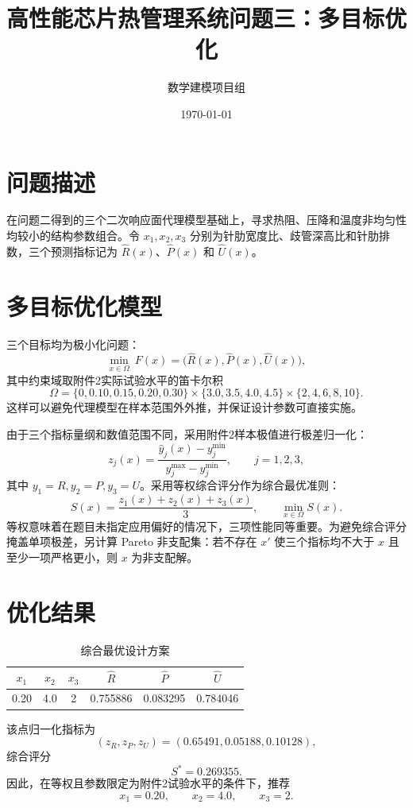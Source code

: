 \documentclass[UTF8,a4paper,12pt]{ctexart}
\title{高性能芯片热管理系统问题三：多目标优化}
\author{数学建模项目组}\date{\today}
\begin{document}
\maketitle
\section{问题描述}
在问题二得到的三个二次响应面代理模型基础上，寻求热阻、压降和温度非均匀性均较小的结构参数组合。令 $x_1,x_2,x_3$ 分别为针肋宽度比、歧管深高比和针肋排数，三个预测指标记为 $\hat R(x)$、$\hat P(x)$ 和 $\hat U(x)$。
\section{多目标优化模型}
三个目标均为极小化问题：
\begin{equation}
\min_{x\in\Omega}\ F(x)=\big(\hat R(x),\hat P(x),\hat U(x)\big),
\end{equation}
其中约束域取附件2实际试验水平的笛卡尔积
\[
\Omega=\{0,0.10,0.15,0.20,0.30\}\times\{3.0,3.5,4.0,4.5\}\times\{2,4,6,8,10\}.
\]
这样可以避免代理模型在样本范围外外推，并保证设计参数可直接实施。

由于三个指标量纲和数值范围不同，采用附件2样本极值进行极差归一化：
\begin{equation}
 z_j(x)=\frac{\hat y_j(x)-y_j^{\min}}{y_j^{\max}-y_j^{\min}},\qquad j=1,2,3,
\end{equation}
其中 $y_1=R,y_2=P,y_3=U$。采用等权综合评分作为综合最优准则：
\begin{equation}
 S(x)=\frac{z_1(x)+z_2(x)+z_3(x)}{3},\qquad \min_{x\in\Omega}S(x).
\end{equation}
等权意味着在题目未指定应用偏好的情况下，三项性能同等重要。为避免综合评分掩盖单项极差，另计算 Pareto 非支配集：若不存在 $x'$ 使三个指标均不大于 $x$ 且至少一项严格更小，则 $x$ 为非支配解。

\section{优化结果}
\begin{table}[h]\centering\caption{综合最优设计方案}
\begin{tabular}{cccccc}\toprule
$x_1$ & $x_2$ & $x_3$ & $\hat R$ & $\hat P$ & $\hat U$\\\midrule
0.20&4.0&2&0.755886&0.083295&0.784046\\
\bottomrule\end{tabular}\end{table}

该点归一化指标为
\[
(z_R,z_P,z_U)=(0.65491,0.05188,0.10128),
\]
综合评分
\[
S^*=0.269355.
\]
因此，在等权且参数限定为附件2试验水平的条件下，推荐
\[
\boxed{x_1=0.20,\qquad x_2=4.0,\qquad x_3=2.}
\]
\end{document}
